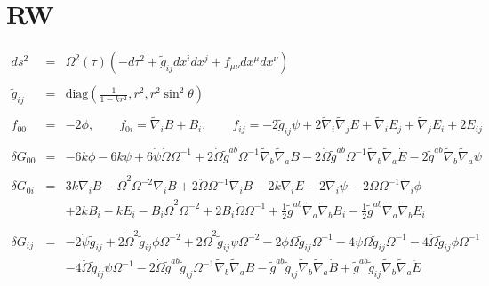 \documentclass[10pt,letterpaper]{article}
\numberwithin{equation}{section}
\begin{document}
\section{RW}
%
\begin{eqnarray}
ds^2 &=& \Omega^2(\tau)(-d\tau^2 + \tilde g_{ij} dx^i dx^j + f_{\mu\nu} dx^\mu dx^\nu)
\\ \nonumber\\
\tilde g_{ij} &=& \text{diag}\left( \frac{1}{1-kr^2},r^2,r^2\sin^2\theta \right)
\\ \nonumber\\
f_{00} &=& -2\phi,\qquad f_{0i}= \tilde \nabla_i B + B_i,\qquad 
f_{ij} = -2 \tilde g_{ij}\psi + 2\tilde\nabla_i\tilde \nabla_j E + \tilde \nabla_i E_j + \tilde \nabla_j E_i + 2E_{ij}
\\ \nonumber\\
\delta G_{00}&=&-6 k \phi
- 6 k \psi
+ 6 \dot{\psi} \dot{\Omega} \Omega^{-1}
+ 2 \dot{\Omega} \tilde{g}^{ab} \Omega^{-1} \tilde{\nabla}_{b}\tilde{\nabla}_{a}B
- 2 \dot{\Omega} \tilde{g}^{ab} \Omega^{-1} \tilde{\nabla}_{b}\tilde{\nabla}_{a}\dot{E}
- 2 \tilde{g}^{ab} \tilde{\nabla}_{b}\tilde{\nabla}_{a}\psi
\\ \nonumber\\
\delta G_{0i}&=&3 k \tilde{\nabla}_{i}B
-  \dot{\Omega}^2 \Omega^{-2} \tilde{\nabla}_{i}B
+ 2 \ddot{\Omega} \Omega^{-1} \tilde{\nabla}_{i}B
- 2 k \tilde{\nabla}_{i}\dot{E}
- 2 \tilde{\nabla}_{i}\dot{\psi}
- 2 \dot{\Omega} \Omega^{-1} \tilde{\nabla}_{i}\phi
\nonumber\\
&&+2 k B_{i}
-  k \dot{E}_{i}
-  B_{i} \dot{\Omega}^2 \Omega^{-2}
+ 2 B_{i} \ddot{\Omega} \Omega^{-1}
+ \tfrac{1}{2} \tilde{g}^{ab} \tilde{\nabla}_{a}\tilde{\nabla}_{b}B_{i}
-  \tfrac{1}{2} \tilde{g}^{ab} \tilde{\nabla}_{a}\tilde{\nabla}_{b}\dot{E}_{i}
\\ \nonumber\\
\delta G_{ij}&=&
-2 \ddot{\psi} \tilde{g}_{ij}
+ 2 \dot{\Omega}^2 \tilde{g}_{ij} \phi \Omega^{-2}
+ 2 \dot{\Omega}^2 \tilde{g}_{ij} \psi \Omega^{-2}
- 2 \dot{\phi} \dot{\Omega} \tilde{g}_{ij} \Omega^{-1}
- 4 \dot{\psi} \dot{\Omega} \tilde{g}_{ij} \Omega^{-1}
- 4 \ddot{\Omega} \tilde{g}_{ij} \phi \Omega^{-1}\nonumber\\
&& - 4 \ddot{\Omega} \tilde{g}_{ij} \psi \Omega^{-1}
- 2 \dot{\Omega} \tilde{g}^{ab} \tilde{g}_{ij} \Omega^{-1} \tilde{\nabla}_{b}\tilde{\nabla}_{a}B
-  \tilde{g}^{ab} \tilde{g}_{ij} \tilde{\nabla}_{b}\tilde{\nabla}_{a}\dot{B}
+ \tilde{g}^{ab} \tilde{g}_{ij} \tilde{\nabla}_{b}\tilde{\nabla}_{a}\ddot{E}\nonumber\\

\end{eqnarray}
\end{document}
